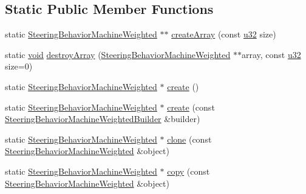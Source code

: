 \subsection*{Static Public Member Functions}
\begin{DoxyCompactItemize}
\item 
static \mbox{\hyperlink{classnjli_1_1_steering_behavior_machine_weighted}{Steering\+Behavior\+Machine\+Weighted}} $\ast$$\ast$ \mbox{\hyperlink{classnjli_1_1_steering_behavior_machine_weighted_af2d0b54091e028661f775b07e77b97e1}{create\+Array}} (const \mbox{\hyperlink{_util_8h_a10e94b422ef0c20dcdec20d31a1f5049}{u32}} size)
\item 
static \mbox{\hyperlink{_thread_8h_af1e856da2e658414cb2456cb6f7ebc66}{void}} \mbox{\hyperlink{classnjli_1_1_steering_behavior_machine_weighted_a5d91176f80ad5e3dd7a5d56383f9d013}{destroy\+Array}} (\mbox{\hyperlink{classnjli_1_1_steering_behavior_machine_weighted}{Steering\+Behavior\+Machine\+Weighted}} $\ast$$\ast$array, const \mbox{\hyperlink{_util_8h_a10e94b422ef0c20dcdec20d31a1f5049}{u32}} size=0)
\item 
static \mbox{\hyperlink{classnjli_1_1_steering_behavior_machine_weighted}{Steering\+Behavior\+Machine\+Weighted}} $\ast$ \mbox{\hyperlink{classnjli_1_1_steering_behavior_machine_weighted_a5f1fa8d36411ff094b1444fdac9d39b5}{create}} ()
\item 
static \mbox{\hyperlink{classnjli_1_1_steering_behavior_machine_weighted}{Steering\+Behavior\+Machine\+Weighted}} $\ast$ \mbox{\hyperlink{classnjli_1_1_steering_behavior_machine_weighted_a631f5e5e58812c839466527b768a3d6a}{create}} (const \mbox{\hyperlink{classnjli_1_1_steering_behavior_machine_weighted_builder}{Steering\+Behavior\+Machine\+Weighted\+Builder}} \&builder)
\item 
static \mbox{\hyperlink{classnjli_1_1_steering_behavior_machine_weighted}{Steering\+Behavior\+Machine\+Weighted}} $\ast$ \mbox{\hyperlink{classnjli_1_1_steering_behavior_machine_weighted_ad1c677f04a95b4a56df14ff847bbe161}{clone}} (const \mbox{\hyperlink{classnjli_1_1_steering_behavior_machine_weighted}{Steering\+Behavior\+Machine\+Weighted}} \&object)
\item 
static \mbox{\hyperlink{classnjli_1_1_steering_behavior_machine_weighted}{Steering\+Behavior\+Machine\+Weighted}} $\ast$ \mbox{\hyperlink{classnjli_1_1_steering_behavior_machine_weighted_ac488695d16aadd9726218938e9be5fa9}{copy}} (const \mbox{\hyperlink{classnjli_1_1_steering_behavior_machine_weighted}{Steering\+Behavior\+Machine\+Weighted}} \&object)
\item 

\end{DoxyCompactItemize}
